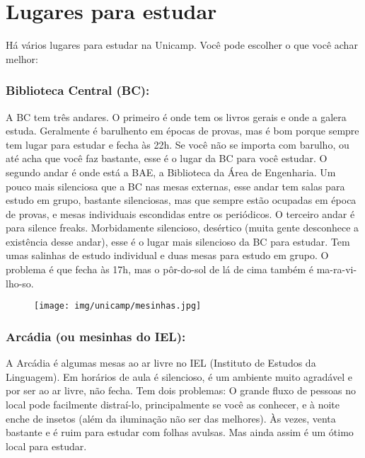 
\section{Lugares para estudar}

Há vários lugares para estudar na Unicamp. Você pode escolher o que você achar
melhor:


\subsubsection{Biblioteca Central (BC):} A BC tem três andares. O primeiro é
onde tem os livros gerais e onde a galera estuda. Geralmente é barulhento em
épocas de provas, mas é bom porque sempre tem lugar para estudar e fecha às 22h.
Se você não se importa com barulho, ou até acha que você faz bastante, esse é o
lugar da BC para você estudar. O segundo andar é onde está a BAE, a Biblioteca
da Área de Engenharia. Um pouco mais silenciosa que a BC nas mesas externas,
esse andar tem salas para estudo em grupo, bastante silenciosas, mas que sempre
estão ocupadas em época de provas, e mesas individuais escondidas entre os
periódicos. O terceiro andar é para silence freaks. Morbidamente silencioso,
desértico (muita gente desconhece a existência desse andar), esse é o lugar mais
silencioso da BC para estudar. Tem umas salinhas de estudo individual e duas
mesas para estudo em grupo. O problema é que fecha às 17h, mas o pôr-do-sol de
lá de cima também é ma-ra-vi-lho-so.

\begin{figure}[h!]  \centering
  \texttt{[image: img/unicamp/mesinhas.jpg]}
\end{figure}

\subsubsection{Arcádia (ou mesinhas do IEL):} A Arcádia é algumas mesas ao ar
livre no IEL (Instituto de Estudos da Linguagem). Em horários de aula é
silencioso, é um ambiente muito agradável e por ser ao ar livre, não fecha.  Tem
dois problemas: O grande fluxo de pessoas no local pode facilmente distraí-lo,
principalmente se você as conhecer, e à noite enche de insetos (além da
iluminação não ser das melhores). Às vezes, venta bastante e é ruim para estudar
com folhas avulsas. Mas ainda assim é um ótimo local para estudar.

